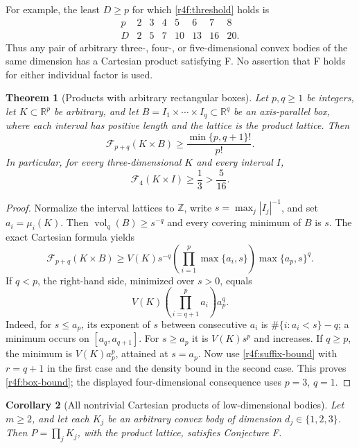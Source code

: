 \documentclass[11pt,a4paper]{article}
\newtheorem{theorem}{Theorem}[section]
\newtheorem{corollary}[theorem]{Corollary}
\theoremstyle{remark}\newtheorem{remark}[theorem]{Remark}
\begin{document}
For example, the least $D\ge p$ for which \eqref{r4f:threshold}
holds is
\[
\begin{array}{c|rrrrrrr}
p&2&3&4&5&6&7&8\\\hline
D&2&5&7&10&13&16&20.
\end{array}
\]
Thus any pair of arbitrary three-, four-, or five-dimensional convex
bodies of the same dimension has a Cartesian product satisfying F.
No assertion that F holds for either individual factor is used.

\begin{theorem}[Products with arbitrary rectangular boxes]
\label{r4f:boxes}
Let $p,q\ge1$ be integers, let $K\subset\mathbb R^p$ be arbitrary, and let
$B=I_1\times\cdots\times I_q\subset\mathbb R^q$ be an axis-parallel
box, where each interval has positive length and the lattice is the
product lattice. Then
\begin{equation}
\label{r4f:box-bound}
 \mathcal F_{p+q}(K\times B)\ge
 \frac{\min\{p,q+1\}!}{p!}.
\end{equation}
In particular, for every three-dimensional $K$ and every interval $I$,
\begin{equation}
\label{r4f:three-prism}
 \mathcal F_4(K\times I)\ge\frac13>\frac5{16}.
\end{equation}
\end{theorem}

\begin{proof}
Normalize the interval lattices to $\mathbb Z$, write
$s=\max_j |I_j|^{-1}$, and set $a_i=\mu_i(K)$.
Then $\operatorname{vol}_q(B)\ge s^{-q}$ and every covering minimum
of $B$ is $s$. The exact Cartesian formula yields
\begin{equation}
\label{r4f:box-objective}
 \mathcal F_{p+q}(K\times B)
 \ge V(K)s^{-q}
       \left(\prod_{i=1}^{p}\max\{a_i,s\}\right)
       \max\{a_p,s\}^{q}.
\end{equation}
If $q<p$, the right-hand side, minimized over $s>0$, equals
\[
 V(K)\left(\prod_{i=q+1}^{p}a_i\right)a_p^q.
\]
Indeed, for $s\le a_p$, its exponent of $s$ between consecutive
$a_i$ is $\#\{i:a_i<s\}-q$; a minimum occurs on
$[a_q,a_{q+1}]$. For $s\ge a_p$ it is $V(K)s^p$ and increases.
If $q\ge p$, the minimum is $V(K)a_p^p$, attained at $s=a_p$.
Now use \eqref{r4f:suffix-bound} with $r=q+1$ in the first case
and the density bound in the second case. This proves
\eqref{r4f:box-bound}; the displayed four-dimensional consequence
uses $p=3$, $q=1$.
\end{proof}

\begin{corollary}[All nontrivial Cartesian products of low-dimensional bodies]
\label{r4f:low-dimensional}
Let $m\ge2$, and let each $K_j$ be an arbitrary convex body of
dimension $d_j\in\{1,2,3\}$. Then $P=\prod_jK_j$, with the product
lattice, satisfies Conjecture F.
\end{corollary}
\end{document}
